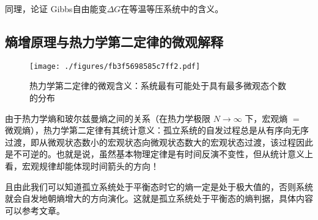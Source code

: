 \begin{exercise}{}
同理，论证 Gibbs自由能变$\Delta G$在等温等压系统中的含义。
\end{exercise}




\subsection{熵增原理与热力学第二定律的微观解释}
\begin{figure}[ht]
\centering
\texttt{[image: ./figures/fb3f5698585c7ff2.pdf]}
\caption{热力学第二定律的微观含义：系统最有可能处于具有最多微观态个数的分布} \label{fig_Td2Law_4}
\end{figure}
由于热力学熵和玻尔兹曼熵之间的关系（在热力学极限 $N\rightarrow \infty$ 下，宏观熵 $=$ 微观熵），热力学第二定律有其统计意义：孤立系统的自发过程总是从有序向无序过渡，即从微观状态数小的宏观状态向微观状态数大的宏观状态过渡，该过程因此是不可逆的。也就是说，虽然基本物理定律是有时间反演不变性，但从统计意义上看，宏观规律却能体现时间箭头的方向！

且由此我们可以知道孤立系统处于平衡态时它的熵一定是处于极大值的，否则系统就会自发地朝熵增大的方向演化。这就是孤立系统处于平衡态的熵判据，具体内容可以参考文章。
